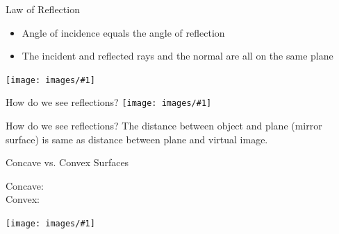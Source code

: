 \documentclass[t]{beamer}
\newcommand{\img}[1]{\texttt{[image: images/\#1]}}
\newcommand{\imgs}[1]{\texttt{[image: images/\#1]}}
\newcommand{\bi}{\begin{itemize}}
\newcommand{\ei}{\end{itemize}}
\begin{document}
\begin{frame}{Law of Reflection}
\bi
\item Angle of incidence equals the angle of reflection
\item The incident and reflected rays and the normal are all on the same plane
\ei
\img{law_of_reflection.png}
\end{frame}

\begin{frame}{How do we see reflections?}
\imgs{mirror.jpg}
\end{frame}

\begin{frame}{How do we see reflections?}
The distance between object and plane (mirror surface) is same as distance between plane and virtual image.
\end{frame}

\begin{frame}{Concave vs. Convex Surfaces}
\begin{description}
\item[Concave:] 
\item[Convex:] 
\end{description}
\imgs{spoon.jpg}
\end{frame}
\end{document}
